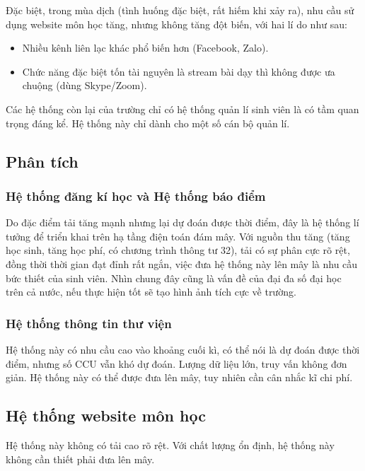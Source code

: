 \documentclass{article}
\begin{document}
Đặc biệt, trong mùa dịch (tình huống đặc biệt, rất hiếm khi xảy ra), nhu cầu sử
dụng website môn học tăng, nhưng không tăng đột biến, với hai lí do như sau:

\begin{itemize}
    \item Nhiều kênh liên lạc khác phổ biến hơn (Facebook, Zalo).
    \item Chức năng đặc biệt tốn tài nguyên là stream bài dạy thì không được ưa
    chuộng (dùng Skype/Zoom).
\end{itemize}

Các hệ thống còn lại của trường chỉ có hệ thống quản lí sinh viên là có tầm quan
trọng đáng kể. Hệ thống này chỉ dành cho một số cán bộ quản lí.

\subsection{Phân tích}

\subsubsection{Hệ thống đăng kí học và Hệ thống báo điểm}

Do đặc điểm tải tăng mạnh nhưng lại dự đoán được thời điểm, đây là hệ thống lí
tưởng để triển khai trên hạ tầng điện toán đám mây. Với nguồn thu tăng (tăng học
sinh, tăng học phí, có chương trình thông tư 32), tải có sự phân cực rõ rệt,
đồng thời thời gian đạt đỉnh rất ngắn, việc đưa hệ thống này lên mây là nhu cầu
bức thiết của sinh viên. Nhìn chung đây cũng là vấn đề của đại đa số đại học
trên cả nước, nếu thực hiện tốt sẽ tạo hình ảnh tích cực về trường.

\subsubsection{Hệ thống thông tin thư viện}

Hệ thống này có nhu cầu cao vào khoảng cuối kì, có thể nói là dự đoán được thời
điểm, nhưng số CCU vẫn khó dự đoán. Lượng dữ liệu lớn, truy vấn không đơn giản.
Hệ thống này có thể được đưa lên mây, tuy nhiên cần cân nhắc kĩ chi phí.

\subsection{Hệ thống website môn học}

Hệ thống này không có tải cao rõ rệt. Với chất lượng ổn định, hệ thống này không
cần thiết phải đưa lên mây.
\end{document}
